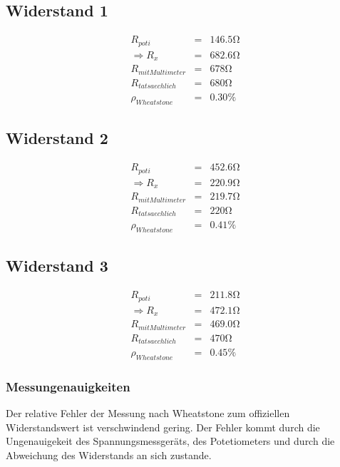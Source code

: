 \documentclass[10pt]{report}
\begin{document}
        \subsection{Widerstand 1}
        \begin{eqnarray*}
            R_{poti} &=& 146.5 \si{\ohm} \\
            \Rightarrow R_{x} &=& 682.6 \si{\ohm}\\
            R_{mitMultimeter} &=& 678\si{\ohm} \\
			R_{tatsaechlich} &=& 680\si{\ohm}\\
			\rho_{Wheatstone} &=& 0.30\%
        \end{eqnarray*}

        \subsection{Widerstand 2}
        \begin{eqnarray*}
            R_{poti} &=& 452.6 \si{\ohm} \\
            \Rightarrow R_{x} &=& 220.9\si{\ohm}\\
            R_{mitMultimeter} &=& 219.7\si{\ohm}\\
			R_{tatsaechlich} &=& 220\si{\ohm}\\
			\rho_{Wheatstone} &=& 0.41\%
        \end{eqnarray*}

        \subsection{Widerstand 3}
        \begin{eqnarray*}
            R_{poti} &=& 211.8 \si{\ohm} \\
            \Rightarrow R_{x} &=& 472.1\si{\ohm}\\
            R_{mitMultimeter} &=& 469.0\si{\ohm}\\
			R_{tatsaechlich} &=& 470\si{\ohm}\\
			\rho_{Wheatstone} &=& 0.45\%
        \end{eqnarray*}

		\subsubsection{Messungenauigkeiten}
        Der relative Fehler der Messung nach Wheatstone zum offiziellen Widerstandswert
		ist verschwindend gering. Der Fehler kommt durch die Ungenauigekeit des Spannungsmessgeräts,
		des Potetiometers und durch die Abweichung des Widerstands an sich zustande.
\end{document}
